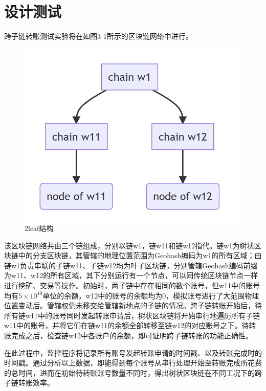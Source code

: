 \section{设计测试}

跨子链转账测试实验将在如图3-1所示的区块链网络中进行。

\begin{figure}[htbp]
    \centering
    \includegraphics[width=\textwidth]{images/2leaf-structure.png}
    \caption{2leaf结构}\label{2leaf结构} %
\end{figure}

该区块链网络共由三个链组成，分别以链w1，链w11和链w12指代。链w1为树状区块链中的分支区块链，其管辖的地理位置范围为Geohash编码为w1的所有区域；由链w1负责串联的子链w11、子链w12均为叶子区块链，分别管辖Geohash编码前缀为w11、w12的所有区域，其下分别运行有一个节点，可以同传统区块链节点一样进行挖矿、交易等操作。初始时，两子链中存在相同的数个账号，但w11中的账号均有$5 \times 10^{40}$单位的余额，w12中的账号的余额均为0，模拟账号进行了大范围物理位置变动后。管辖权仍未移交给管辖新地点的子链的情况。跨子链转账开始后，待所有链w11中的账号同时发起转账申请后，树状区块链将开始串行地遍历所有子链w11中的账号，并将它们在链w11的余额全部转移至链w12的对应账号之下。待转账完成之后，检查链w12中各账户的余额，即可证明跨子链转账的功能正确性。

在此过程中，监控程序将记录所有账号发起转账申请的时间戳、以及转账完成时的时间戳。通过分析以上数据，即能得到每个账号从串行处理开始至转账完成所花费的总时间，进而在初始待转账账号数量不同时，得出树状区块链在不同工况下的跨子链转账效率。

